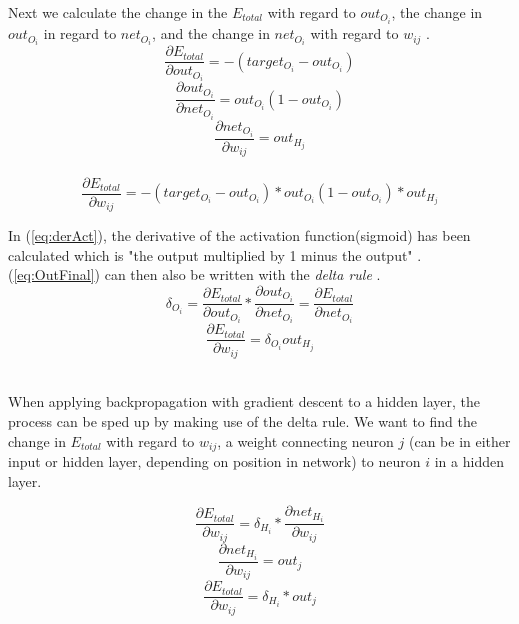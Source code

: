 \documentclass[10pt]{article}
\begin{document}
		Next we calculate the change in the $E_{total}$ with regard to $out_{O_i}$, the change in $out_{O_i}$ in regard to $net_{O_i}$, and the change in $net_{O_i}$ with regard to $w_{ij}$ \cite{bpexample}.
		\begin{equation}
			\frac{\partial E_{total}}{\partial out_{O_i}} = -(target_{O_i} - out_{O_i})
		\end{equation}
		\begin{equation}\label{eq:derAct}
			\frac{\partial out_{O_i}}{\partial net_{O_i}} = out_{O_i}(1 - out_{O_i})
		\end{equation}
		\begin{equation}
			\frac{\partial net_{O_i}}{\partial w_{ij}} = out_{H_j}
		\end{equation}\\
		\begin{equation}\label{eq:OutFinal}
			\frac{\partial E_{total}}{\partial w_{ij}} = -(target_{O_i} - out_{O_i}) * out_{O_i}(1 - out_{O_i}) * out_{H_j}
		\end{equation}
				 
		In (\ref{eq:derAct}), the derivative of the activation function(sigmoid) has been calculated which is "the output multiplied by 1 minus the output" \cite{bpexample}.\\
				 
		(\ref{eq:OutFinal}) can then also be written with the \textit{delta rule} \cite{bpexample}.			 
		\begin{equation}
			\delta_{O_i} = \frac{\partial E_{total}}{\partial out_{O_i}} * \frac{\partial out_{O_i}}{\partial net_{O_i}} = \frac{\partial E_{total}}{\partial net_{O_i}}
		\end{equation}
		\begin{equation}
			\frac{\partial E_{total}}{\partial w_{ij}} = \delta_{O_i}out_{H_j}
		\end{equation}\\
		
		\medskip
		
		When applying backpropagation with gradient descent to a hidden layer, the process can be sped up by making use of the delta rule. We want to find the change in $E_{total}$ with regard to $w_{ij}$, a weight connecting neuron $j$ (can be in either input or hidden layer, depending on position in network) to neuron $i$ in a hidden layer. \cite{bpexample}
				
		\begin{equation}
			\frac{\partial E_{total}}{\partial w_{ij}} = \delta_{H_i} * \frac{\partial net_{H_i}}{\partial w_{ij}}
		\end{equation}
		\begin{equation}
			\frac{\partial net_{H_i}}{\partial w_{ij}} = out_j
		\end{equation}
		\begin{equation}
			\frac{\partial E_{total}}{\partial w_{ij}} = \delta_{H_i} * out_j
		\end{equation}\\
				
\end{document}
